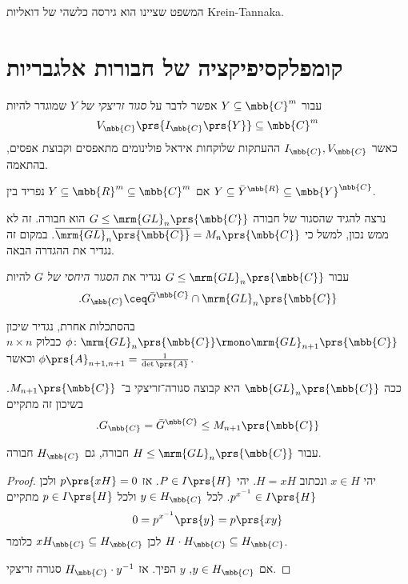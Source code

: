 \documentclass[10pt, twoside]{book}
\newcommand{\textenglish}[1]{\foreignlanguage{english}{#1}}
\begin{document}
המשפט שציינו הוא גירסה כלשהי של דואליות
\textenglish{Krein-Tannaka}.

\section{קומפלקסיפיקציה של חבורות אלגבריות}

\begin{definition}
עבור
$Y \subseteq \mbb{C}^m$
אפשר לדבר על
\emph{סגור זריצקי של
$Y$}
שמוגדר להיות
\[V_{\mbb{C}}\prs{I_{\mbb{C}}\prs{Y}} \subseteq \mbb{C}^m\]
כאשר
$I_{\mbb{C}}, V_{\mbb{C}}$
ההעתקות שלוקחות אידאל פולינומים מתאפסים וקבוצת אפסים, בהתאמה.
\end{definition}

\begin{remark}
אם
$Y \subseteq \mbb{R}^m \subseteq \mbb{C}^m$
נפריד בין
$Y \subseteq \bar{Y}^{\mbb{R}} \subseteq \mbb{Y}^{\mbb{C}}$.

נרצה להגיד שהסגור של חבורה
$G \leq \mrm{GL}_n\prs{\mbb{C}}$
הוא חבורה. זה לא ממש נכון, למשל כי
$\overline{\mrm{GL}_n\prs{\mbb{C}}} = M_n\prs{\mbb{C}}$.
במקום זה נגדיר את ההגדרה הבאה.
\end{remark}

\begin{definition}
עבור
$G \leq \mrm{GL}_n\prs{\mbb{C}}$
נגדיר את
\emph{הסגור היחסי של
$G$}
להיות
\[\text{.} G_{\mbb{C}} \ceq \bar{G}^{\mbb{C}} \cap \mrm{GL}_n\prs{\mbb{C}}\]
\end{definition}

\begin{example}
בהסתכלות אחרת, נגדיר שיכון
$\phi \colon \mrm{GL}_n\prs{\mbb{C}} \rmono \mrm{GL}_{n+1}\prs{\mbb{C}}$
כבלוק
$n \times n$
וכאשר
$\phi\prs{A}_{n+1,n+1} = \frac{1}{\det\prs{A}}$.

ככה
$\mbb{GL}_n\prs{\mbb{C}}$
היא קבוצה סגורה־זריצקי ב־%
$M_{n+1}\prs{\mbb{C}}$.
בשיכון זה מתקיים
\[\text{.} G_{\mbb{C}} = \bar{G}^{\mbb{C}} \leq M_{n+1}\prs{\mbb{C}}\]
\end{example}

\begin{lemma}
עבור
$H \leq \mrm{GL}_n\prs{\mbb{C}}$
חבורה, גם
$H_{\mbb{C}}$
חבורה.
\end{lemma}

\begin{proof}
יהי
$x \in H$
ונכתוב
$H = xH$.
יהי
$P \in I\prs{H}$.
אז
$p\prs{xH} = 0$
ולכן
$p^{x^{-1}} \in I\prs{H}$.
לכל
$y \in H_{\mbb{C}}$
ולכל
$p \in I\prs{H}$
מתקיים
\[0 = p^{x^{-1}}\prs{y} = p\prs{xy}\]
לכן
$xH_{\mbb{C}} \subseteq H_{\mbb{C}}$
כלומר
$H \cdot H_{\mbb{C}} \subseteq H_{\mbb{C}}$.

אם
$y \in H_{\mbb{C}}$,
$y$
הפיך.
אז
$H_{\mbb{C}} \cdot y^{-1}$
סגורה זריצקי.

\end{proof}
\end{document}
